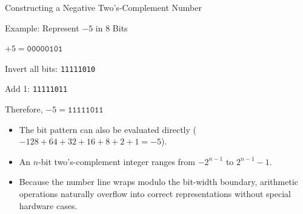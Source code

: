 \documentclass[aspectratio=169,11pt,t]{beamer}
\newcommand{\bits}[1]{\texttt{#1}}
\begin{document}
\begin{frame}{Constructing a Negative Two's-Complement Number}

\begin{block}{Example: Represent $-5$ in 8 Bits}
\centering
\large

$+5 = \bits{00000101}$

\vspace{0.12cm}

Invert all bits:
\bits{11111010}

\vspace{0.12cm}

Add 1:
\bits{11111011}

\vspace{0.12cm}

Therefore,
$-5 = \bits{11111011}$

\end{block}

\vfill

\begin{itemize}\setlength{\itemsep}{4pt}
  \item The bit pattern can also be evaluated directly ($-128 + 64 + 32 + 16 + 8 + 2 + 1 = -5$).
  \item An $n$-bit two's-complement integer ranges from $-2^{n-1}$ to $2^{n-1}-1$.
  \item Because the number line wraps modulo the bit-width boundary, arithmetic operations naturally overflow into correct representations without special hardware cases.
\end{itemize}

\end{frame}





\end{document}

